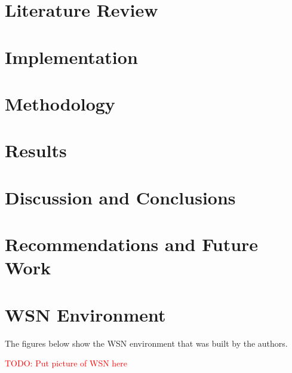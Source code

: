 \documentclass[a4paper,11pt]{kth-mag}
\begin{document}
\chapter{Literature Review}


\chapter{Implementation}


\chapter{Methodology}


\chapter{Results}


\chapter{Discussion and Conclusions}


\chapter{Recommendations and Future Work} 




\pagebreak



\appendix
\addappheadtotoc

\chapter{WSN Environment}

The figures below show the WSN environment that was built by the authors. 

\noindent \textcolor{red}{TODO: Put picture of WSN here}
\end{document}
